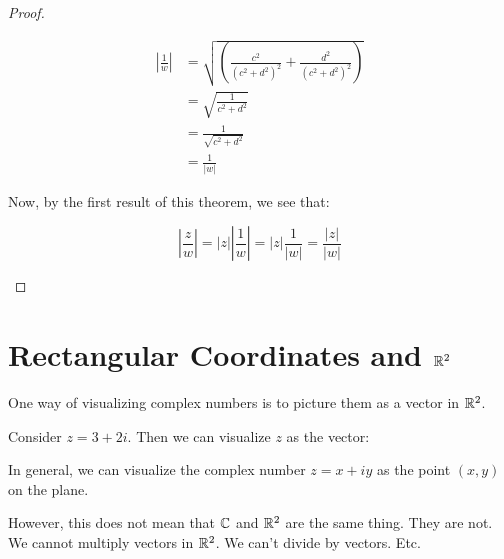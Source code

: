 \begin{proof}
\begin{enumerate}
\begin{align*}\left|\frac{1}{w}\right| &= \sqrt{\left(\frac{c^2}{(c^2 + d^2)^2} + \frac{d^2}{(c^2 + d^2)^2}\right)} \\
&= \sqrt{\frac{1}{c^2 + d^2}}\\
&= \frac{1}{\sqrt{c^2 + d^2}}\\
&= \frac{1}{|w|}
\end{align*}

Now, by the first result of this theorem, we see that:

$$\left|\frac{z}{w}\right| = |z|\left|\frac{1}{w}\right| = |z|\frac{1}{|w|} = \frac{|z|}{|w|}$$

\end{enumerate}

\end{proof}


\section{Rectangular Coordinates and $\mathbb{R}^2$}

One way of visualizing complex numbers is to picture them as a vector in $\mathbb{R}^2$.

\begin{ex}{}{} Consider $z = 3 + 2i$. Then we can visualize $z$ as the vector:

\begin{center}
\end{center}

\end{ex}

\begin{note} In general, we can visualize the complex number $z = x + iy$ as the point $(x,y)$ on the plane.

However, this does not mean that $\mathbb{C}$ and $\mathbb{R}^2$ are the same thing. They are not. We cannot multiply vectors in $\mathbb{R}^2$. We can't divide by vectors. Etc.
\end{note}

